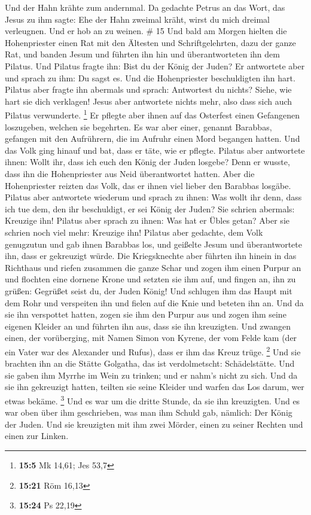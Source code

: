  Und der Hahn krähte zum andernmal. Da gedachte Petrus an
das Wort, das Jesus zu ihm sagte: Ehe der Hahn zweimal kräht, wirst du
mich dreimal verleugnen. Und er hob an zu weinen. \# 15 
Und bald am Morgen hielten die Hohenpriester einen Rat mit den Ältesten
und Schriftgelehrten, dazu der ganze Rat, und banden Jesum und führten
ihn hin und überantworteten ihn dem Pilatus.  Und Pilatus
fragte ihn: Bist du der König der Juden? Er antwortete aber und sprach
zu ihm: Du sagst es.  Und die Hohenpriester beschuldigten
ihn hart.  Pilatus aber fragte ihn abermals und sprach:
Antwortest du nichts? Siehe, wie hart sie dich verklagen! 
Jesus aber antwortete nichts mehr, also dass sich auch Pilatus
verwunderte. \footnote{\textbf{15:5} Mk 14,61; Jes 53,7} 
Er pflegte aber ihnen auf das Osterfest einen Gefangenen loszugeben,
welchen sie begehrten.  Es war aber einer, genannt
Barabbas, gefangen mit den Aufrührern, die im Aufruhr einen Mord
begangen hatten.  Und das Volk ging hinauf und bat, dass
er täte, wie er pflegte.  Pilatus aber antwortete ihnen:
Wollt ihr, dass ich euch den König der Juden losgebe? 
Denn er wusste, dass ihn die Hohenpriester aus Neid überantwortet
hatten.  Aber die Hohenpriester reizten das Volk, das er
ihnen viel lieber den Barabbas losgäbe.  Pilatus aber
antwortete wiederum und sprach zu ihnen: Was wollt ihr denn, dass ich
tue dem, den ihr beschuldigt, er sei König der Juden? 
Sie schrien abermals: Kreuzige ihn!  Pilatus aber sprach
zu ihnen: Was hat er Übles getan? Aber sie schrien noch viel mehr:
Kreuzige ihn!  Pilatus aber gedachte, dem Volk genugzutun
und gab ihnen Barabbas los, und geißelte Jesum und überantwortete ihn,
dass er gekreuzigt würde.  Die Kriegsknechte aber führten
ihn hinein in das Richthaus und riefen zusammen die ganze Schar
 und zogen ihm einen Purpur an und flochten eine dornene
Krone und setzten sie ihm auf,  und fingen an, ihn zu
grüßen: Gegrüßet seist du, der Juden König!  Und schlugen
ihm das Haupt mit dem Rohr und verspeiten ihn und fielen auf die Knie
und beteten ihn an.  Und da sie ihn verspottet hatten,
zogen sie ihm den Purpur aus und zogen ihm seine eigenen Kleider an und
führten ihn aus, dass sie ihn kreuzigten.  Und zwangen
einen, der vorüberging, mit Namen Simon von Kyrene, der vom Felde kam
(der ein Vater war des Alexander und Rufus), dass er ihm das Kreuz
trüge. \footnote{\textbf{15:21} Röm 16,13}  Und sie
brachten ihn an die Stätte Golgatha, das ist verdolmetscht:
Schädelstätte.  Und sie gaben ihm Myrrhe im Wein zu
trinken; und er nahm's nicht zu sich.  Und da sie ihn
gekreuzigt hatten, teilten sie seine Kleider und warfen das Los darum,
wer etwas bekäme. \footnote{\textbf{15:24} Ps 22,19}  Und
es war um die dritte Stunde, da sie ihn kreuzigten.  Und
es war oben über ihm geschrieben, was man ihm Schuld gab, nämlich: Der
König der Juden.  Und sie kreuzigten mit ihm zwei Mörder,
einen zu seiner Rechten und einen zur Linken.

